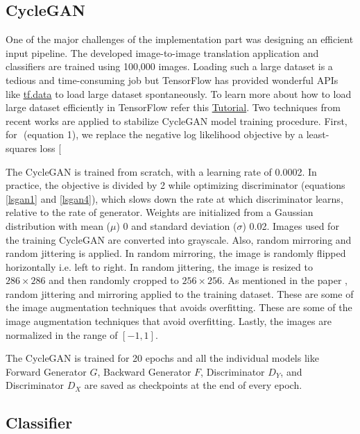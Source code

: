 \subsection{CycleGAN}
One of the major challenges of the implementation part was designing an efficient input pipeline. The developed image-to-image translation application and classifiers are trained using 100,000 images. Loading such a large dataset is a tedious and time-consuming job but TensorFlow has provided wonderful APIs like \href{https://www.tensorflow.org/guide/data}{tf.data} to load large dataset spontaneously. To learn more about how to load large dataset efficiently in TensorFlow refer this \href{https://www.tensorflow.org/tutorials/load_data/images}{Tutorial}. Two techniques from recent works are applied to stabilize \ac{CycleGAN} model training procedure. First, for $ $ (equation 1), we replace the negative log likelihood
objective by a least-squares loss [


The \ac{CycleGAN} is trained from scratch, with a learning rate of 0.0002. In practice, the objective is divided by 2 while optimizing discriminator (equations \ref{lsgan1} and \ref{lsgan4}), which slows down the rate at which discriminator learns, relative to the rate of generator.  Weights are initialized from a Gaussian distribution with mean ($\mu$) 0 and standard deviation ($\sigma$) 0.02. Images used for the training \ac{CycleGAN} are converted into grayscale. Also, random mirroring and random jittering is applied. In random mirroring, the image is randomly flipped horizontally i.e. left to right. In random jittering, the image is resized to $286 \times 286$ and then randomly cropped to $256 \times 256$. As mentioned in the paper \cite{zhu2020unpaired}, random jittering and mirroring applied to the training dataset. These are some of the image augmentation techniques that avoids overfitting. These are some of the image augmentation techniques that avoid overfitting. Lastly, the images are normalized in the range of $[-1, 1]$. 



The \ac{CycleGAN} is trained for 20 epochs and all the individual models like Forward Generator $G$, Backward Generator $F$, Discriminator $D_Y$, and Discriminator $D_X$ are saved as checkpoints at the end of every epoch. 



\subsection{Classifier}


